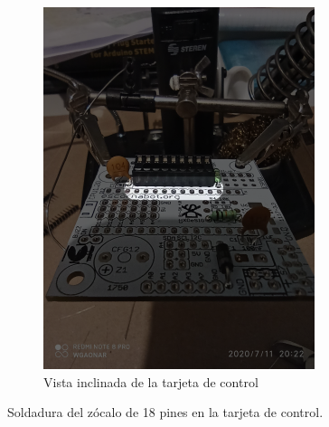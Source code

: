 \documentclass{article}
\begin{document}
\begin{figure}[H]
\begin{subfigure}[t]{0.3\textwidth}
        \includegraphics[width=0.9\columnwidth, height=1.2\columnwidth]{images/CPU/cpu_zocalo_3.png}
        \caption{Vista inclinada de la tarjeta de control}
        \label{fig:cpu_zocalo_3}
    \end{subfigure}
    \caption{Soldadura del zócalo de 18 pines en la tarjeta de control.}
    \label{fig:cpu_zocalo}
\end{figure}
\end{document}
